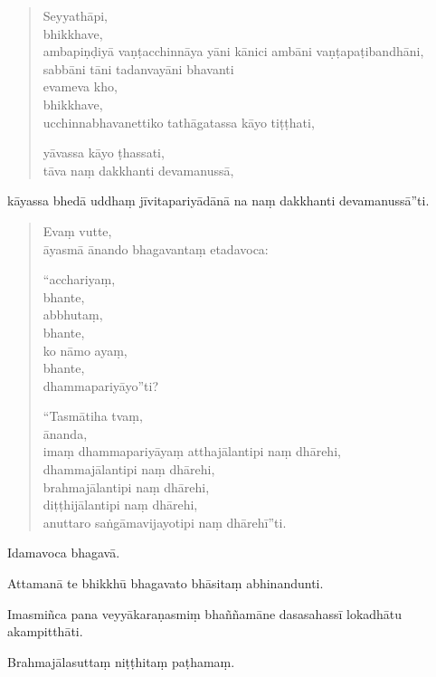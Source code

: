 \documentclass[11pt,twoside,openright]{book}
\begin{document}
\begin{verse}
Seyyathāpi,\\
\vin  bhikkhave,\\
\vin  ambapiṇḍiyā vaṇṭacchinnāya yāni kānici ambāni vaṇṭapaṭibandhāni,\\
\vin  sabbāni tāni tadanvayāni bhavanti\\


evameva kho,\\
\vin  bhikkhave,\\
\vin  ucchinnabhavanettiko tathāgatassa kāyo tiṭṭhati,\\
\vin 

yāvassa kāyo ṭhassati,\\
\vin  tāva naṃ dakkhanti devamanussā,\\
\vin 

\end{verse}
\pstart
kāyassa bhedā uddhaṃ jīvitapariyādānā na naṃ dakkhanti devamanussā”ti.
\pend

\begin{verse}
Evaṃ vutte,\\
\vin  āyasmā ānando bhagavantaṃ etadavoca:

“acchariyaṃ,\\
\vin  bhante,\\
\vin  abbhutaṃ,\\
\vin  bhante,\\
\vin  ko nāmo ayaṃ,\\
\vin  bhante,\\
\vin  dhammapariyāyo”ti?

“Tasmātiha tvaṃ,\\
\vin  ānanda,\\
\vin  imaṃ dhammapariyāyaṃ atthajālantipi naṃ dhārehi,\\
\vin  dhammajālantipi naṃ dhārehi,\\
\vin  brahmajālantipi naṃ dhārehi,\\
\vin  diṭṭhijālantipi naṃ dhārehi,\\
\vin  anuttaro saṅgāmavijayotipi naṃ dhārehī”ti.

\end{verse}
\pstart
Idamavoca bhagavā.
\pend

\pstart
Attamanā te bhikkhū bhagavato bhāsitaṃ abhinandunti.
\pend

\pstart
Imasmiñca pana veyyākaraṇasmiṃ bhaññamāne dasasahassī lokadhātu akampitthāti.
\pend

\pstart
Brahmajālasuttaṃ niṭṭhitaṃ paṭhamaṃ.
\pend

\newpage

\endnumbering
\end{document}
